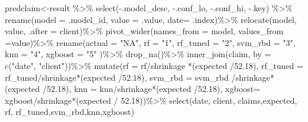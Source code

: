 \documentclass[
]{article}
\newenvironment{Shaded}{\begin{snugshade}}{\end{snugshade}}
\newcommand{\AttributeTok}[1]{\textcolor[rgb]{0.77,0.63,0.00}{#1}}
\newcommand{\FloatTok}[1]{\textcolor[rgb]{0.00,0.00,0.81}{#1}}
\newcommand{\FunctionTok}[1]{\textcolor[rgb]{0.00,0.00,0.00}{#1}}
\newcommand{\NormalTok}[1]{#1}
\newcommand{\OtherTok}[1]{\textcolor[rgb]{0.56,0.35,0.01}{#1}}
\newcommand{\SpecialCharTok}[1]{\textcolor[rgb]{0.00,0.00,0.00}{#1}}
\newcommand{\StringTok}[1]{\textcolor[rgb]{0.31,0.60,0.02}{#1}}
\begin{document}
\begin{Shaded}
\begin{Highlighting}[]
\NormalTok{predclaim}\OtherTok{\textless{}{-}}\NormalTok{result }\SpecialCharTok{\%\textgreater{}\%}
  \FunctionTok{select}\NormalTok{(}\SpecialCharTok{{-}}\NormalTok{.model\_desc, }\SpecialCharTok{{-}}\NormalTok{.conf\_lo, }\SpecialCharTok{{-}}\NormalTok{.conf\_hi, }\SpecialCharTok{{-}}\NormalTok{.key) }\SpecialCharTok{\%\textgreater{}\%}
  \FunctionTok{rename}\NormalTok{(}\AttributeTok{model =}\NormalTok{ .model\_id, }\AttributeTok{value =}\NormalTok{ .value, }\AttributeTok{date=}\NormalTok{ .index)}\SpecialCharTok{\%\textgreater{}\%}
  \FunctionTok{relocate}\NormalTok{(model, value, }\AttributeTok{.after =}\NormalTok{ client)}\SpecialCharTok{\%\textgreater{}\%}
  \FunctionTok{pivot\_wider}\NormalTok{(}\AttributeTok{names\_from =}\NormalTok{ model, }\AttributeTok{values\_from =}\NormalTok{value)}\SpecialCharTok{\%\textgreater{}\%}
  \FunctionTok{rename}\NormalTok{(}\AttributeTok{actual =} \StringTok{"NA"}\NormalTok{, }\AttributeTok{rf =} \StringTok{"1"}\NormalTok{, }\AttributeTok{rf\_tuned =} \StringTok{"2"}\NormalTok{, }\AttributeTok{svm\_rbd =} \StringTok{"3"}\NormalTok{, }\AttributeTok{knn =} \StringTok{"4"}\NormalTok{, }\AttributeTok{xgboost =} \StringTok{"5"}\NormalTok{ )}\SpecialCharTok{\%\textgreater{}\%}
  \FunctionTok{drop\_na}\NormalTok{()}\SpecialCharTok{\%\textgreater{}\%}
 \FunctionTok{inner\_join}\NormalTok{(claim, }\AttributeTok{by =} \FunctionTok{c}\NormalTok{(}\StringTok{"date"}\NormalTok{, }\StringTok{"client"}\NormalTok{))}\SpecialCharTok{\%\textgreater{}\%}
  \FunctionTok{mutate}\NormalTok{(}\AttributeTok{rf =}\NormalTok{ rf}\SpecialCharTok{/}\NormalTok{shrinkage }\SpecialCharTok{*}\NormalTok{(expected }\SpecialCharTok{/}\FloatTok{52.18}\NormalTok{),}
         \AttributeTok{rf\_tuned =}\NormalTok{ rf\_tuned}\SpecialCharTok{/}\NormalTok{shrinkage}\SpecialCharTok{*}\NormalTok{(expected }\SpecialCharTok{/}\FloatTok{52.18}\NormalTok{),}
         \AttributeTok{svm\_rbd =}\NormalTok{ svm\_rbd }\SpecialCharTok{/}\NormalTok{shrinkage}\SpecialCharTok{*}\NormalTok{(expected }\SpecialCharTok{/}\FloatTok{52.18}\NormalTok{),}
         \AttributeTok{knn =}\NormalTok{ knn}\SpecialCharTok{/}\NormalTok{shrinkage}\SpecialCharTok{*}\NormalTok{(expected }\SpecialCharTok{/}\FloatTok{52.18}\NormalTok{),}
         \AttributeTok{xgboost=}\NormalTok{ xgboost}\SpecialCharTok{/}\NormalTok{shrinkage}\SpecialCharTok{*}\NormalTok{(expected }\SpecialCharTok{/} \FloatTok{52.18}\NormalTok{))}\SpecialCharTok{\%\textgreater{}\%}
  \FunctionTok{select}\NormalTok{(date, client, claims,expected, rf, rf\_tuned,svm\_rbd,knn,xgboost)}


\end{Highlighting}
\end{Shaded}
\end{document}
